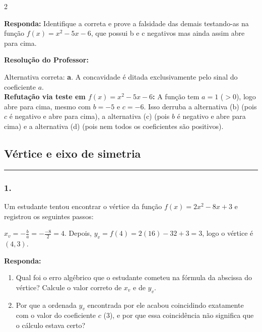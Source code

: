 \begin{multicols*}{2}
\begin{boxresponda}
\textbf{Responda:} Identifique a correta e prove a falsidade das demais testando-as na função $f(x) = x^2 - 5x - 6$, que possui b e c negativos mas ainda assim abre para cima.
\end{boxresponda}

\ifgabarito
    \begin{tcolorbox}[colback=CorTitUm!5, colframe=CorTitUm, boxrule=1pt, arc=4pt, left=6pt, right=6pt, top=6pt, bottom=6pt]
    \small\textbf{\textcolor{CorTitUm}{Resolução do Professor:}}\par\vspace{0.1cm}
    \color{CinzaEscuro}
    Alternativa correta: \textbf{a}. A concavidade é ditada exclusivamente pelo sinal do coeficiente $a$. \\
    \textbf{Refutação via teste em $f(x) = x^2 - 5x - 6$:} A função tem $a=1$ ($>0$), logo abre para cima, mesmo com $b=-5$ e $c=-6$. Isso derruba a alternativa (b) (pois $c$ é negativo e abre para cima), a alternativa (c) (pois $b$ é negativo e abre para cima) e a alternativa (d) (pois nem todos os coeficientes são positivos).
    \end{tcolorbox}
\fi

\par\vspace{\espacoQuestao}


\subsection*{Vértice e eixo de simetria}
\vspace{-0.2cm}\noindent\rule{\linewidth}{1.5pt} 
\par\vspace{\espacoPosTitulo}
\subsubsection*{1.} Um estudante tentou encontrar o vértice da função $f(x) = 2x^2 - 8x + 3$ e registrou os seguintes passos:
\begin{center}
$x_v = -\frac{b}{a} = -\frac{-8}{2} = 4$. Depois, $y_v = f(4) = 2(16) - 32 + 3 = 3$, logo o vértice é $(4,3)$.
\end{center}

\begin{boxresponda}
\textbf{Responda:} 
\begin{enumerate}[label=\alph*), itemsep=\espacoAlt]
\item Qual foi o erro algébrico que o estudante cometeu na fórmula da abscissa do vértice? Calcule o valor correto de $x_v$ e de $y_v$.
\item Por que a ordenada $y_v$ encontrada por ele acabou coincidindo exatamente com o valor do coeficiente $c$ ($3$), e por que essa coincidência não significa que o cálculo estava certo?
\end{enumerate}
\end{boxresponda}


\end{multicols*}
